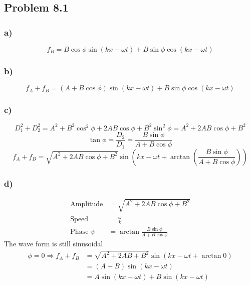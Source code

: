 \documentclass[../homework.tex]{subfiles}
\begin{document}
\subsection{Problem 8.1}
\subsubsection*{a)}
\begin{equation*}
    f_B = B \cos \phi \sin(kx - \omega t) + B \sin \phi \cos (kx - \omega t)
\end{equation*}
\subsubsection*{b)}
\begin{equation*}
    f_A + f_B = (A + B \cos \phi) \sin(kx - \omega t) + B \sin \phi \cos(kx - \omega t)
\end{equation*}
\subsubsection*{c)}
\begin{equation*}
    D_1^2 + D_2^2 = A^2 + B^2 \cos^2 \phi + 2AB\cos \phi + B^2 \sin^2 \phi = A^2 + 2AB\cos \phi + B^2
\end{equation*}
\begin{equation*}
    \tan \phi = \frac{D_2}{D_1} = \frac{B \sin \phi}{A + B \cos \phi}
\end{equation*}
\begin{equation*}
    f_A + f_B = \sqrt{A^2 + 2AB\cos \phi + B^2} \sin\left(kx - \omega t + \arctan \left( \frac{B \sin \phi}{A + B \cos \phi}\right) \right)
\end{equation*}
\subsubsection*{d)}
\begin{align*}
    \text{Amplitude} &= \sqrt{A^2 + 2AB\cos \phi + B^2} \\
    \text{Speed} &= \frac{\omega}{k} \\
    \text{Phase } \psi &= \arctan \frac{B \sin \phi}{A + B \cos \phi}
\end{align*}\indent
The wave form is still sinusoidal
\begin{align*}
    \phi = 0 \Rightarrow f_A + f_B &= \sqrt{A^2 + 2AB + B^2} \sin \left(kx - \omega t + \arctan 0 \right)\\
     &= (A+B) \sin(kx -\omega t) \\
     &= A\sin(kx -\omega t) + B \sin(kx -\omega t)
\end{align*}
\end{document}
